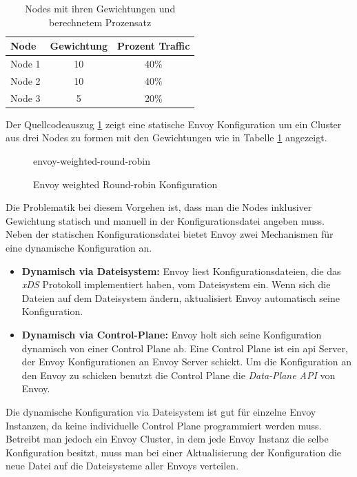 \begin{table}[h!]
\centering
\renewcommand{\arraystretch}{1.5}
\begin{tabular}{|l|c|c|}
    \hline
    \textbf{Node} & \textbf{Gewichtung} & \textbf{Prozent Traffic} \\
    \hline
    \hline
    Node 1 & 10 & 40\% \\
    \hline
    Node 2 & 10 & 40\% \\
    \hline
    Node 3 & 5 & 20\% \\
    \hline
\end{tabular}
\caption{Nodes mit ihren Gewichtungen und berechnetem Prozensatz}
\label{table:example-cluster-weight}
\end{table}
Der Quellcodeauszug \ref{code:envoy-cluster-weight} zeigt eine statische Envoy Konfiguration um ein Cluster aus drei Nodes zu formen mit den Gewichtungen wie in Tabelle \ref{table:example-cluster-weight} angezeigt.
\begin{figure}
    {envoy-weighted-round-robin}
    \caption{Envoy weighted Round-robin Konfiguration}
    \label{code:envoy-cluster-weight}
\end{figure}
Die Problematik bei diesem Vorgehen ist, dass man die Nodes inklusiver Gewichtung statisch und manuell in der Konfigurationsdatei angeben muss.
Neben der statischen Konfigurationsdatei bietet Envoy zwei Mechanismen für eine dynamische Konfiguration an.
\begin{itemize}
  \item \textbf{Dynamisch via Dateisystem:} Envoy liest Konfigurationsdateien, die das \textit{xDS} Protokoll implementiert haben, vom Dateisystem ein. Wenn sich die Dateien auf dem Dateisystem ändern, aktualisiert Envoy automatisch seine Konfiguration.
    \cite{ConfigurationDynamicFilesystem}
  \item \textbf{Dynamisch via Control-Plane:} Envoy holt sich seine Konfiguration dynamisch von einer Control Plane ab. Eine Control Plane ist ein \ac{api} Server, der Envoy Konfigurationen an Envoy Server schickt. Um die Konfiguration an den Envoy zu schicken benutzt die Control Plane die \textit{Data-Plane API}\cite{EnvoyproxyDataplaneapi2021} von Envoy.
    \cite{ConfigurationDynamicControl}
\end{itemize}
Die dynamische Konfiguration via Dateisystem ist gut für einzelne Envoy Instanzen, da keine individuelle Control Plane programmiert werden muss. Betreibt man jedoch ein Envoy Cluster, in dem jede Envoy Instanz die selbe Konfiguration besitzt, muss man bei einer Aktualisierung der Konfiguration die neue Datei auf die Dateisysteme aller Envoys verteilen.
